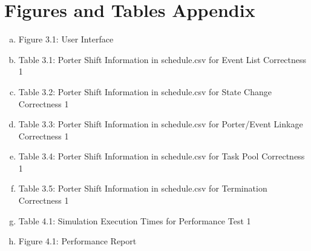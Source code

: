 \documentclass[paper=letter, fontsize=10pt]{scrartcl}
\numberwithin{equation}{section}		%
\numberwithin{figure}{section}			%
\numberwithin{table}{section}				%
\begin{document}
\section{Figures and Tables Appendix}
\begin{enumerate}[(a)]
	\item Figure 3.1: User Interface
	\item Table  3.1: Porter Shift Information in schedule.csv for Event List Correctness 1
	\item Table  3.2: Porter Shift Information in schedule.csv for State Change Correctness 1
	\item Table  3.3: Porter Shift Information in schedule.csv for Porter/Event Linkage Correctness 1
	\item Table  3.4: Porter Shift Information in schedule.csv for Task Pool Correctness 1
	\item Table  3.5: Porter Shift Information in schedule.csv for Termination Correctness 1
	\item Table  4.1: Simulation Execution Times for Performance Test 1
	\item Figure 4.1: Performance Report
\end{enumerate}

\end{document}

